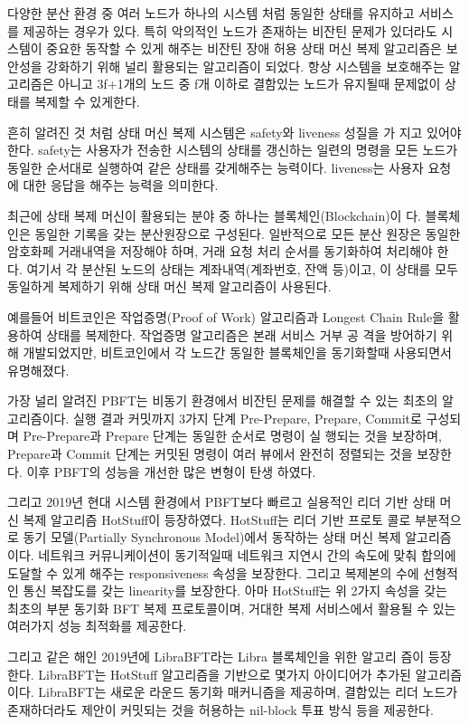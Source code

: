 다양한 분산 환경 중 여러 노드가 하나의 시스템 처럼
동일한 상태를 유지하고 서비스를 제공하는 경우가 있다.
특히 악의적인 노드가 존재하는 비잔틴 문제가 있더라도 시스템이
중요한 동작할 수 있게 해주는 비잔틴 장애 허용 상태 머신 복제 알고리즘은
보안성을 강화하기 위해 널리 활용되는 알고리즘이 되었다.
항상 시스템을 보호해주는 알고리즘은 아니고 3f+1개의 노드 중 f개 이하로 
결함있는 노드가 유지될때 문제없이 상태를 복제할 수 있게한다.

흔히 알려진 것 처럼 상태 머신 복제 시스템은 safety와 liveness 성질을 가
지고 있어야 한다. safety는 사용자가 전송한 시스템의 상태를 갱신하는 일련의
명령을 모든 노드가 동일한 순서대로 실행하여 같은 상태를 갖게해주는 능력이다.
liveness는 사용자 요청에 대한 응답을 해주는 능력을 의미한다.

최근에 상태 복제 머신이 활용되는 분야 중 하나는 블록체인(Blockchain)이
다. 블록체인은 동일한 기록을 갖는 분산원장으로 구성된다. 일반적으로 모든
분산 원장은 동일한 암호화페 거래내역을 저장해야 하며, 거래 요청 처리 순서를
동기화하여 처리해야 한다. 여기서 각 분산된 노드의 상태는 계좌내역(계좌번호,
잔액 등)이고, 이 상태를 모두 동일하게 복제하기 위해 상태 머신 복제 알고리즘이
사용된다.

예를들어 비트코인은 작업증명(Proof of Work) 알고리즘과 Longest Chain
Rule을 활용하여 상태를 복제한다. 작업증명 알고리즘은 본래 서비스 거부 공
격을 방어하기 위해 개발되었지만, 비트코인에서 각 노드간 동일한 블록체인을
동기화할때 사용되면서 유명해졌다.

가장 널리 알려진 PBFT는 비동기 환경에서 비잔틴 문제를 해결할 수 있는
최초의 알고리즘이다. 실행 결과 커밋까지 3가지 단계 Pre-Prepare, Prepare,
Commit로 구성되며 Pre-Prepare과 Prepare 단계는 동일한 순서로 명령이 실
행되는 것을 보장하며, Prepare과 Commit 단계는 커밋된 명령이 여러 뷰에서
완전히 정렬되는 것을 보장한다. 이후 PBFT의 성능을 개선한 많은 변형이 탄생
하였다.

그리고 2019년 현대 시스템 환경에서 PBFT보다 빠르고 실용적인 리더 기반
상태 머신 복제 알고리즘 HotStuff이 등장하였다. HotStuff는 리더 기반 프로토
콜로 부분적으로 동기 모델(Partially Synchronous Model)에서 동작하는 상태
머신 복제 알고리즘이다. 네트워크 커뮤니케이션이 동기적일때 네트워크 지연시
간의 속도에 맞춰 합의에 도달할 수 있게 해주는 responsiveness 속성을 보장한다.
그리고 복제본의 수에 선형적인 통신 복잡도를 갖는 linearity를 보장한다. 아마
HotStuff는 위 2가지 속성을 갖는 최초의 부분 동기화 BFT 복제 프로토콜이며,
거대한 복제 서비스에서 활용될 수 있는 여러가지 성능 최적화를 제공한다.

그리고 같은 해인 2019년에 LibraBFT라는 Libra 블록체인을 위한 알고리
즘이 등장한다. LibraBFT는 HotStuff 알고리즘을 기반으로 몇가지 아이디어가
추가된 알고리즘이다. LibraBFT는 새로운 라운드 동기화 매커니즘을 제공하며,
결함있는 리더 노드가 존재하더라도 제안이 커밋되는 것을 허용하는 nil-block
투표 방식 등을 제공한다.


